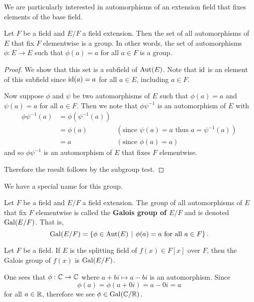 We are particularly interested in automorphisms of an extension field that fixes elements of the base field.
\begin{proposition}\label{prop-galois-group-is-indeed-group}
    Let $F$ be a field and $E/F$ a field extension. Then the set of all automorphisms of $E$ that fix $F$ elementwise is a group. In other words, the set of automorphisms $\phi: E \to E$ such that $\phi(a) = a$ for all $a \in F$ is a group.
\end{proposition}
\begin{proof}
    We show that this set is a subfield of $\mathrm{Aut}(E)$. Note that $\mathrm{id}$ is an element of this subfield since $\mathrm{id}(a) = a$ for all $a \in E$, including $a \in F$.

    Now suppose $\phi$ and $\psi$ be two automorphisms of $E$ such that $\phi(a) = a$ and $\psi(a) = a$ for all $a \in F$. Then we note that $\phi\psi^{-1}$ is an automorphism of $E$ with
    \begin{align*}
        \phi\psi^{-1}(a) &= \phi(\psi^{-1}(a))\\
        &= \phi(a) & (\text{since }\psi(a) = a \text{ thus } a = \psi^{-1}(a))\\
        &= a & (\text{since }\phi(a) = a)
    \end{align*}
    and so $\phi\psi^{-1}$ is an automorphism of $E$ that fixes $F$ elementwise.

    Therefore the result follows by the subgroup test.
\end{proof}

We have a special name for this group.
\begin{definition}
    Let $F$ be a field and $E/F$ a field extension. The group of all automorphisms of $E$ that fix $F$ elementwise is called the \textbf{Galois group of $E/F$} and is denoted $\mathrm{Gal}(E/F)$. That is,
    \[
        \Gal{E/F} = \left\{\phi \in \Aut{E} \vert \phi(a) = a \text{ for all } a \in F\right\}.
    \]
\end{definition}
\begin{remark}
    Let $F$ be a field. If $E$ is the splitting field of $f(x) \in F[x]$ over $F$, then the Galois group of $f(x)$ is $\mathrm{Gal}(E/F)$.
\end{remark}

\begin{example}
    One sees that $\phi: \mathbb{C} \to \mathbb{C}$ where $a+bi \mapsto a - bi$ is an automorphism. Since
    \[
        \phi(a) = \phi(a + 0i) = a - 0i = a
    \]
    for all $a \in \mathbb{R}$, therefore we see $\phi \in \mathrm{Gal}(\mathbb{C}/\mathbb{R})$.
\end{example}


